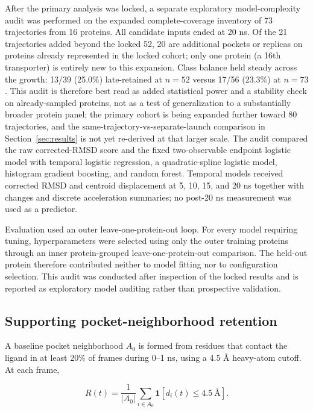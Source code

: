 \documentclass[11pt]{article}
\begin{document}
After the primary analysis was locked, a separate exploratory model-complexity audit was performed on the expanded complete-coverage inventory of 73 trajectories from 16 proteins. All candidate inputs ended at 20 ns. Of the 21 trajectories added beyond the locked 52, 20 are additional pockets or replicas on proteins already represented in the locked cohort; only one protein (a 16th transporter) is entirely new to this expansion. Class balance held steady across the growth: 13/39 (25.0\%) late-retained at $n=52$ versus 17/56 (23.3\%) at $n=73$. This audit is therefore best read as added statistical power and a stability check on already-sampled proteins, not as a test of generalization to a substantially broader protein panel; the primary cohort is being expanded further toward 80 trajectories, and the same-trajectory-vs-separate-launch comparison in Section~\ref{sec:results} is not yet re-derived at that larger scale. The audit compared the raw corrected-RMSD score and the fixed two-observable endpoint logistic model with temporal logistic regression, a quadratic-spline logistic model, histogram gradient boosting, and random forest. Temporal models received corrected RMSD and centroid displacement at 5, 10, 15, and 20 ns together with changes and discrete acceleration summaries; no post-20 ns measurement was used as a predictor.

Evaluation used an outer leave-one-protein-out loop. For every model requiring tuning, hyperparameters were selected using only the outer training proteins through an inner protein-grouped leave-one-protein-out comparison. The held-out protein therefore contributed neither to model fitting nor to configuration selection. This audit was conducted after inspection of the locked results and is reported as exploratory model auditing rather than prospective validation.

\subsection{Supporting pocket-neighborhood retention}

A baseline pocket neighborhood $A_0$ is formed from residues that contact the ligand in at least 20\% of frames during 0--1 ns, using a 4.5 \AA{} heavy-atom cutoff. At each frame,

\begin{equation}
R(t)=\frac{1}{|A_0|}\sum_{i\in A_0}\mathbf{1}[d_i(t)\leq4.5\ \text{\AA}].
\end{equation}
\end{document}
